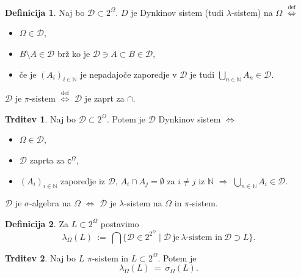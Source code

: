 \documentclass[11pt]{article}
\newcommand{\N}{\mathbb{N}}
\newcommand{\D}{\mathcal{D}}
\renewcommand{\L}{L}
\renewcommand{\c}{\mathsf{c}}
\newcommand{\diff}{\overset{\text{def}}{\iff}}
\newcommand{\set}[1]{\{#1\}}
\newcommand{\1}{\mathbbm{1}}
\theoremstyle{definition}
\newtheorem{definicija}{Definicija}[section]
\theoremstyle{definition}
\newtheorem{trditev}{Trditev}[section]
\theoremstyle{definition}
\theoremstyle{definition}
\begin{document}
\begin{definicija}

Naj bo $\D \subset 2^\Omega$. $D$ je Dynkinov sistem (tudi $\lambda$-sistem) na $\Omega$ $\diff$
\begin{itemize}
	\item $\Omega \in \D$,
	\item $B\setminus A \in \D $ brž ko je $ \D \ni A \subset B \in \D$,
	\item če je $(A_i)_{i \in \N}$ je nepadajoče zaporedje v $\D$ je tudi $\bigcup_{n \in \N} A_n \in \D$.
\end{itemize}
$\D$ je $\pi$-sistem $\diff$ $\D$ je zaprt za $\cap$.

\end{definicija}
\vspace{0.5cm}

\begin{trditev}

Naj bo $\D \subset 2^\Omega$. Potem je $\D$ Dynkinov sistem $\iff$
\begin{itemize}
	\item $\Omega \in \D$,
	\item $\D$ zaprta za $\c^\Omega$,
	\item $(A_i)_{i \in \N}$ zaporedje iz $\D$, $A_i \cap A_j = \emptyset$ za $i \neq j$ iz $\N$ $\Longrightarrow$ $\bigcup_{n \in \N} A_i \in \D$.
\end{itemize}
$\D$ je $\sigma$-algebra na $\Omega$ $\iff$ $\D$ je $\lambda$-sistem na $\Omega$ in $\pi$-sistem.

\end{trditev}
\vspace{0.5cm}

\begin{definicija}

Za $\L \subset 2^\Omega$ postavimo
$$\lambda_\Omega(\L) ~:=~ \bigcap\set{\D \in 2^{2^\Omega} \mid \D ~\text{je}~\lambda\text{-sistem in}~\D\supset\L}.$$

\end{definicija}
\vspace{0.5cm}

\begin{trditev}

Naj bo $\L$ $\pi$-sistem in $\L \subset 2^\Omega$. Potem je
$$\lambda_\Omega(\L) ~=~ \sigma_\Omega(\L).$$

\end{trditev}
\vspace{0.5cm}
\end{document}
